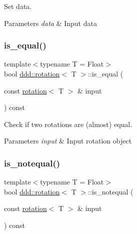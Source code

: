 Set data. 


\begin{DoxyParams}{Parameters}
{\em data} & Input data \\
\hline
\end{DoxyParams}
\mbox{\label{classddd_1_1rotation_a3af65c771a81cd62655802ce3ee22614}} 
\subsubsection{\texorpdfstring{is\+\_\+equal()}{is\_equal()}}
{\footnotesize\ttfamily template$<$typename T  = Float$>$ \\
bool \hyperlink{classddd_1_1rotation}{ddd\+::rotation}$<$ T $>$\+::is\+\_\+equal (\begin{DoxyParamCaption}\item[{const \hyperlink{classddd_1_1rotation}{rotation}$<$ T $>$ \&}]{input }\end{DoxyParamCaption}) const\hspace{0.3cm}{\ttfamily [inline]}}



Check if two rotations are (almost) equal. 


\begin{DoxyParams}{Parameters}
{\em input} & Input rotation object \\
\hline
\end{DoxyParams}
\mbox{\label{classddd_1_1rotation_aa1aba1ad41c7d09edce377bd5cb6efbb}} 
\subsubsection{\texorpdfstring{is\+\_\+notequal()}{is\_notequal()}}
{\footnotesize\ttfamily template$<$typename T  = Float$>$ \\
bool \hyperlink{classddd_1_1rotation}{ddd\+::rotation}$<$ T $>$\+::is\+\_\+notequal (\begin{DoxyParamCaption}\item[{const \hyperlink{classddd_1_1rotation}{rotation}$<$ T $>$ \&}]{input }\end{DoxyParamCaption}) const\hspace{0.3cm}{\ttfamily [inline]}}



